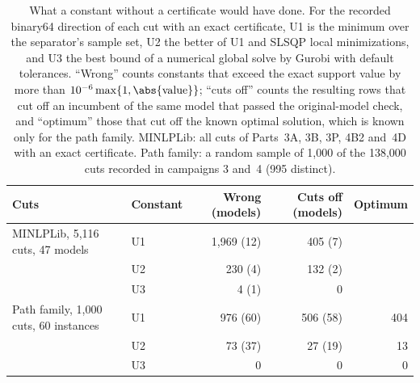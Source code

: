 \begin{table}[t]
\centering\footnotesize
\caption{What a constant without a certificate would have done. For the
recorded binary64 direction of each cut with an exact certificate, U1 is the
minimum over the separator's sample set, U2 the better of U1 and SLSQP local
minimizations, and U3 the best bound of a numerical global solve by Gurobi with
default tolerances. ``Wrong'' counts constants that exceed the exact support
value by more than $10^{-6}\max\{1,\abs{\text{value}}\}$; ``cuts off'' counts
the resulting rows that cut off an incumbent of the same model that passed the
original-model check, and ``optimum'' those that cut off the known optimal
solution, which is known only for the path family. MINLPLib: all cuts of
Parts~3A, 3B, 3P, 4B2 and~4D with an exact certificate. Path family: a random
sample of 1{,}000 of the 138{,}000 cuts recorded in campaigns 3 and~4 (995
distinct).}\label{tab:ablation}
\begin{tabular}{@{}llrrr@{}}
\toprule
Cuts & Constant & Wrong (models) & Cuts off (models) & Optimum\\
\midrule
MINLPLib, 5{,}116 cuts, 47 models & U1 & 1{,}969 (12) & 405 (7) & \\
 & U2 & 230 (4) & 132 (2) & \\
 & U3 & 4 (1) & 0 & \\
\midrule
Path family, 1{,}000 cuts, 60 instances & U1 & 976 (60) & 506 (58) & 404\\
 & U2 & 73 (37) & 27 (19) & 13\\
 & U3 & 0 & 0 & 0\\
\bottomrule
\end{tabular}
\end{table}

